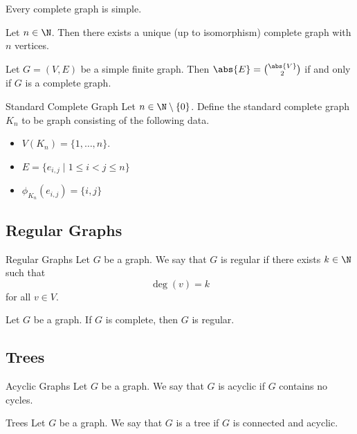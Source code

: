\documentclass[a4paper]{article}
\begin{document}
\begin{lmm}{}{} Every complete graph is simple. 
\end{lmm}

\begin{prp}{}{} Let $n\in\N$. Then there exists a unique (up to isomorphism) complete graph with $n$ vertices. 
\end{prp}

\begin{lmm}{}{} Let $G=(V,E)$ be a simple finite graph. Then $\abs{E}=\binom{\abs{V}}{2}$ if and only if $G$ is a complete graph. 
\end{lmm}

\begin{defn}{Standard Complete Graph}{} Let $n\in\N\setminus\{0\}$. Define the standard complete graph $K_n$ to be graph consisting of the following data. 
\begin{itemize}
\item $V(K_n)=\{1,\dots,n\}$. 
\item $E=\{e_{i,j}\;|\;1\leq i<j\leq n\}$
\item $\phi_{K_n}(e_{i,j})=\{i,j\}$
\end{itemize}
\end{defn}

\subsection{Regular Graphs}
\begin{defn}{Regular Graphs}{} Let $G$ be a graph. We say that $G$ is regular if there exists $k\in\N$ such that $$\deg(v)=k$$ for all $v\in V$. 
\end{defn}

\begin{lmm}{}{} Let $G$ be a graph. If $G$ is complete, then $G$ is regular. 
\end{lmm}

\subsection{Trees}
\begin{defn}{Acyclic Graphs}{} Let $G$ be a graph. We say that $G$ is acyclic if $G$ contains no cycles. 
\end{defn}

\begin{defn}{Trees}{} Let $G$ be a graph. We say that $G$ is a tree if $G$ is connected and acyclic. 
\end{defn}
\end{document}
